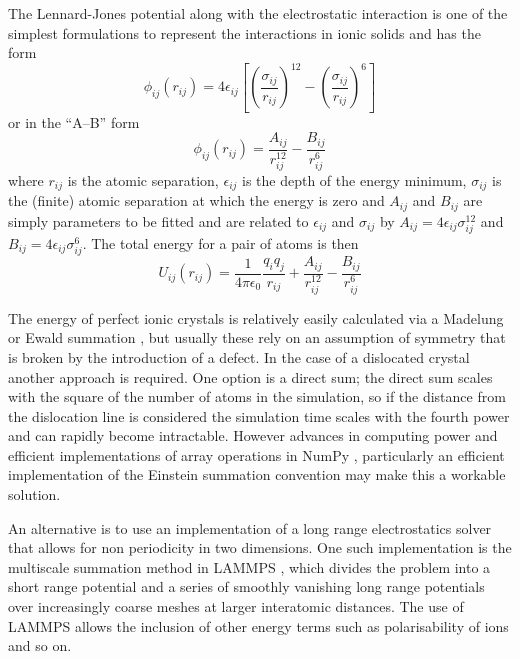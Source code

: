 The Lennard-Jones potential along with the electrostatic interaction is one of the simplest formulations to represent the interactions in ionic solids and has the form
\begin{equation}
\phi_{ij}(r_{ij}) = 4\epsilon_{ij} \left[ \left( \frac{\sigma_{ij}}{r_{ij}}\right)^{12}-     \left( \frac{\sigma_{ij}}{r_{ij}}\right)^6   \right]
\end{equation}
or in the ``A--B'' form
\begin{equation}
\phi_{ij}(r_{ij}) = \frac{A_{ij}}{r_{ij}^{12}} - \frac{B_{ij}}{r_{ij}^{6}}
\end{equation}
where $r_{ij}$ is the atomic separation, $\epsilon_{ij}$ is the depth of the energy minimum, $\sigma_{ij}$ is the (finite) atomic separation at which the energy is zero and $A_{ij}$ and $B_{ij}$ are simply parameters to be fitted and are related to $\epsilon_{ij}$ and $\sigma_{ij}$ by $A_{ij} = 4\epsilon_{ij}\sigma_{ij}^{12}$ and $B_{ij} = 4 \epsilon_{ij} \sigma_{ij}^{6}$. The total energy for a pair of atoms is then
\begin{equation}
U_{ij}(r_{ij}) = \frac{1}{4\pi\epsilon_0} \frac{q_i q_j}{r_{ij}} + \frac{A_{ij}}{r_{ij}^{12}} - \frac{B_{ij}}{r_{ij}^{6}}
\end{equation}




The energy of perfect ionic crystals is relatively easily calculated  via a Madelung or Ewald summation \cite{madelung1918,Ewald1921}, but usually these rely on an assumption of symmetry that is broken by the introduction of a defect. In the case of a dislocated crystal another approach is required. One option is a direct sum; the direct sum scales with the square of the number of atoms in the simulation, so if the distance from the dislocation line is considered the simulation time scales with the fourth power and can rapidly become intractable. However advances in computing power and efficient implementations of array operations in NumPy \cite{Numpy2011}, particularly an efficient implementation of the Einstein summation convention \cite{opt_einsum} may make this a workable solution.


An alternative is to use an implementation of a long range electrostatics solver that allows for non periodicity in two dimensions. One such implementation is the multiscale summation method in LAMMPS \cite{Hardy2009,LAMMPS_web}, which divides the problem into a short range potential and a series of smoothly vanishing long range potentials over increasingly coarse meshes at larger interatomic distances. The use of LAMMPS allows the inclusion of other energy terms such as polarisability of ions and so on.


